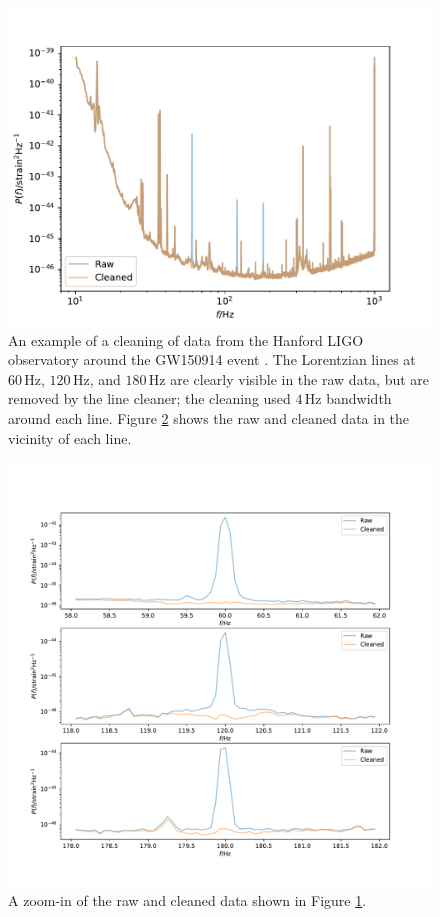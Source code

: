 \documentclass[modern]{aastex631}
\begin{document}
\begin{figure}
    \includegraphics[width=\columnwidth]{raw-and-cleaned-psd.pdf}
    \caption{\label{fig:cleaned-psd} An example of a cleaning of data from the Hanford LIGO observatory around the GW150914 event \cite{Abbott2016,Abbott2019,GWOSC,GWOSC2,GW150914-GWOSC}.  The Lorentzian lines at $60 \, \mathrm{Hz}$, $120 \, \mathrm{Hz}$, and $180 \, \mathrm{Hz}$ are clearly visible in the raw data, but are removed by the line cleaner; the cleaning used $4 \, \mathrm{Hz}$ bandwidth around each line.  Figure \ref{fig:line-zoom} shows the raw and cleaned data in the vicinity of each line.}
\end{figure}

\begin{figure}
    \includegraphics[width=\columnwidth]{line-zoom-in.pdf}
    \caption{\label{fig:line-zoom} A zoom-in of the raw and cleaned data shown in Figure \ref{fig:cleaned-psd}.}
\end{figure}
\end{document}
